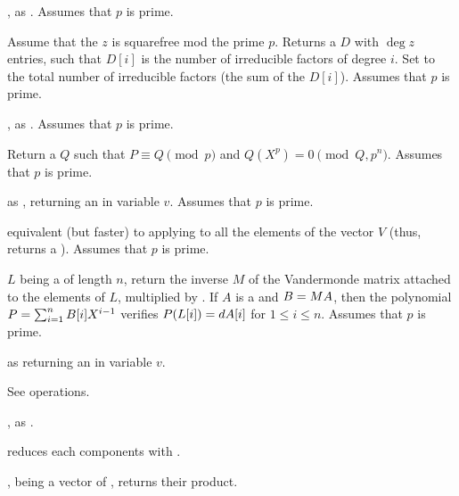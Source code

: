 , as .
Assumes that $p$ is prime.

 Assume
that the  $z$ is squarefree mod the prime $p$. Returns a
 $D$ with $\deg z$ entries, such that $D[i]$ is the number of
irreducible factors of degree $i$. Set  to the total number of
irreducible factors (the sum of the $D[i]$).
Assumes that $p$ is prime.

,\hfil\break
as . Assumes that $p$ is prime.





Return a  $Q$ such that $P\equiv Q\pmod{p}$ and
$Q(X^p)=0\pmod{Q,p^n}$. Assumes that $p$ is prime.

 as ,
returning an  in variable $v$. Assumes that $p$ is prime.

 equivalent (but
faster) to applying  to all the elements of the
vector $V$ (thus, returns a ). Assumes that $p$ is prime.

 $L$ being a 
of length $n$, return the inverse $M$ of the Vandermonde matrix attached to
the elements of $L$, multiplied by .
If $A$ is a  and $B=M\*A$, then the polynomial
$P=\sum_{i=1}^n B[i]\*X^{i-1}$ verifies $P(L[i])=d\*A[i]$ for
$1 \leq i \leq n$. Assumes that $p$ is prime.

 as
 returning an  in variable $v$.

 See  operations.

, as .

 reduces each components with .

,  being a vector of ,
returns their product.

